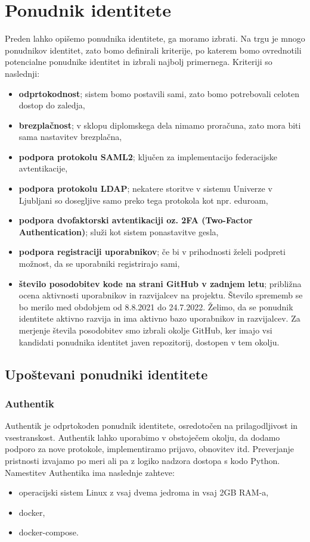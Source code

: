 \documentclass[a4paper,12pt,openright,oneside]{book}
\begin{document}
\section{Ponudnik identitete}
Preden lahko opišemo ponudnika identitete, ga moramo izbrati. Na trgu je mnogo ponudnikov identitet, zato bomo definirali kriterije, po katerem bomo ovrednotili potencialne ponudnike identitet in izbrali najbolj primernega. Kriteriji so naslednji:
\begin{itemize}
    \item \textbf{odprtokodnost}; sistem bomo postavili sami, zato bomo potrebovali celoten dostop do zaledja, 
    \item \textbf{brezplačnost}; v sklopu diplomskega dela nimamo proračuna, zato mora biti sama nastavitev brezplačna,
    \item \textbf{podpora protokolu SAML2}; ključen za implementacijo federacijske avtentikacije,
    \item \textbf{podpora protokolu LDAP}; nekatere storitve v sistemu Univerze v Ljubljani so dosegljive samo preko tega protokola kot npr. eduroam, 
    \item \textbf{podpora dvofaktorski avtentikaciji oz. 2FA (Two-Factor Authentication)}; služi kot sistem ponastavitve gesla,
    \item \textbf{podpora registraciji uporabnikov}; če bi v prihodnosti želeli podpreti možnost, da se uporabniki registrirajo sami, 
    \item \textbf{število posodobitev kode na strani GitHub \cite{github} v zadnjem letu}; približna ocena aktivnosti uporabnikov in razvijalcev na projektu. Število sprememb se bo merilo med obdobjem od 8.8.2021 do 24.7.2022. Želimo, da se ponudnik identitete aktivno razvija in ima aktivno bazo uporabnikov in razvijalcev. Za merjenje števila posodobitev smo izbrali okolje GitHub, ker imajo vsi kandidati ponudnika identitet javen repozitorij, dostopen v tem okolju. 
\end{itemize}

\subsection{Upoštevani ponudniki identitete}
\subsubsection{Authentik}
Authentik \cite{AuthentikLink} je odprtokoden ponudnik identitete, osredotočen na prilagodljivost in vsestranskost. Authentik lahko uporabimo v obstoječem okolju, da dodamo podporo za nove protokole, implementiramo prijavo, obnovitev itd. Preverjanje pristnosti izvajamo po meri ali pa z logiko nadzora dostopa s kodo Python.
\newline
Namestitev Authentika ima naslednje zahteve:
\begin{itemize}
    \item operacijski sistem Linux z vsaj dvema jedroma in vsaj 2GB RAM-a,
    \item docker,
    \item docker-compose.
\end{itemize}
\end{document}
